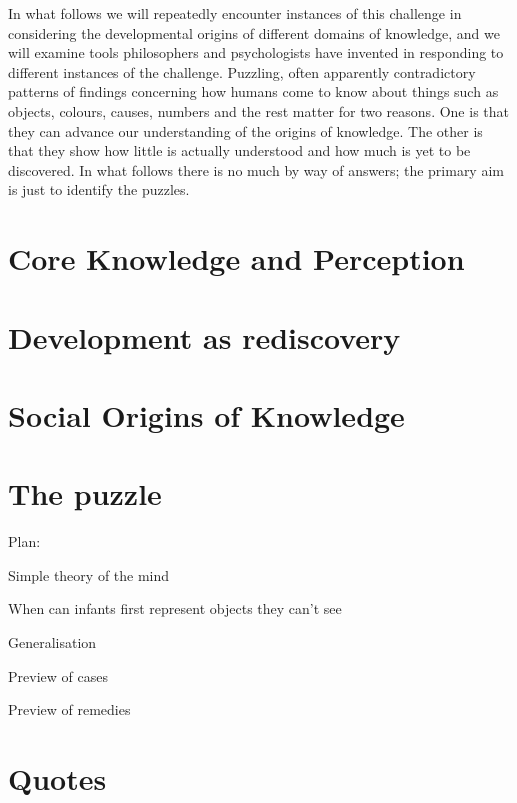 \documentclass[12pt,\papersize]{extarticle}
\begin{document}
In what follows we will repeatedly encounter instances of this challenge  in considering the developmental origins of different domains of knowledge, 
and we will examine tools philosophers and psychologists have invented in responding to different instances of the challenge.  
Puzzling, often apparently contradictory patterns of findings concerning how humans come to know about things such as objects, colours, causes, numbers and the rest matter for two reasons.
One is that they can advance our understanding of  the origins of knowledge.
The other is that they show how little is actually understood and how much is yet to be discovered.
In what follows there is no much by way of answers; the primary aim is just to identify the puzzles.




\section{Core Knowledge and Perception}


\section{Development as rediscovery}

\section{Social Origins of Knowledge}




\section{The puzzle}
\label{sec:puzzle}

Plan:

Simple theory of the mind

When can infants first represent objects they can't see

Generalisation

Preview of cases

Preview of remedies


\section{Quotes}
\end{document}
